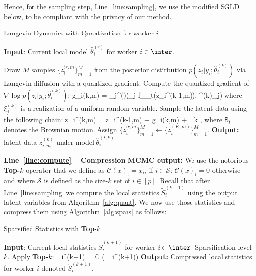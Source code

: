 \documentclass{article}
\begin{document}
Hence, for the sampling step, Line~\ref{line:sampling}, we use the modified SGLD below, to be compliant with the privacy of our method.
\begin{algorithm}[H]
\caption{Langevin Dynamics with Quantization for worker $i$} \label{alg:quant}
\begin{algorithmic}[1]
\STATE \textbf{Input}: Current local model $\hat{\theta}^{(r)}_i$ for worker $i \in \inter$.

\STATE Draw $M$ samples $\{ z_{i}^{(r,m} \}_{m=1}^M$ from the posterior distirbution $p(z_i| y_i; \hat{\theta}^{(k)}_i)$ via Langevin diffusion with a quantized gradient:\label{line:langevin}
\STATE Compute the quantized gradient of $\nabla \log p(z_i| y_i; \hat{\theta}^{(k)}_i)$:
\beq\label{eq:grad}
g_i{(k,m)} = _{j}^{(\ell)}\left(\nabla_j f_{\theta_t}(z_i^{(k-1,m)}), \xi^{(k)}_{j}\right)
\eeq
where $\xi^{(k)}_{j}$ is a realization of a uniform random variable.
\STATE Sample the latent data using the following chain:
\beq\label{eq:lang}
z_i^{(k,m)} = z_i^{(k-1,m)} +   g_i{(k,m)} +   _k \eqsp,
\eeq
where $\mathsf{B}_t$ denotes the Brownian motion.
\ENDFOR
\STATE Assign $\{ z_{i}^{(r,m} \}_{m=1}^M \leftarrow \{ z_i^{(K,m)} \}_{m=1}^M$.
\STATE \textbf{Output:} latent data $z_{i,m}^{(k)}$ under model $\hat{\theta}^{(t,k)}_i$ 
\end{algorithmic}
\end{algorithm}



\noindent \textbf{Line~\ref{line:compute} -- Compression MCMC output:}
We use the notorious \textbf{Top-$k$} operator that we define as $\mathcal C(x)_i=x_i$, if $i\in \mathcal S$; $\mathcal C(x)_i=0$ otherwise and where $\mathcal S$ is defined as the size-$k$ set of $i\in[p]$.
Recall that after Line~\ref{line:sampling} we compute the local statistics $\tilde{S}_{i}^{(k+1)}$ using the output latent variables from Algorithm~\ref{alg:quant}.
We now use those statistics and compress them using Algorithm~\ref{alg:spars} as follows:

\begin{algorithm}[H]
\caption{Sparsified Statistics with \textbf{Top-$k$}} \label{alg:spars}
\begin{algorithmic}[1]
\STATE \textbf{Input}: Current local statistics $\tilde{S}_{i}^{(k+1)}$ for worker $i \in \inter$. Sparsification level $k$.
\STATE Apply \textbf{Top-$k$}:
\beq\label{eq:topkstats}
_{i}^{(k+1)} = \mathcal C \left( _{i}^{(k+1)}\right)
\eeq
\STATE \textbf{Output:} Compressed local statistics for worker $i$ denoted $\ddot{S}_{i}^{(k+1)}$.
\end{algorithmic}
\end{algorithm}
\end{document}

